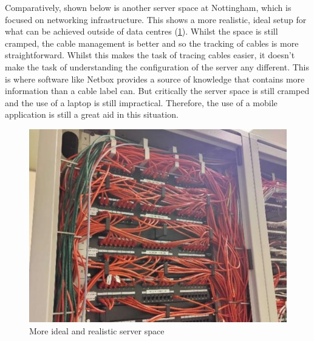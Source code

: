 \documentclass [11pt,a4paper]{article}
\begin{document}
Comparatively, shown below is another server space at Nottingham, which is focused on networking infrastructure. This shows a more realistic, ideal setup for what can be achieved outside of data centres (\ref{fig:ideal_server_space}). Whilst the space is still cramped, the cable management is better and so the tracking of cables is more straightforward. Whilst this makes the task of tracing cables easier, it doesn't make the task of understanding the configuration of the server any different. This is where software like Netbox provides a source of knowledge that contains more information than a cable label can. But critically the server space is still cramped and the use of a laptop is still impractical. Therefore, the use of a mobile application is still a great aid in this situation.

\begin{figure}[H]
    \centering
    \includegraphics[width=0.36\linewidth]{images/server_racks_clean.jpg}
    \caption{More ideal and realistic server space\cite{ideal_server_pic}}
    \label{fig:ideal_server_space}
\end{figure}
\end{document}

